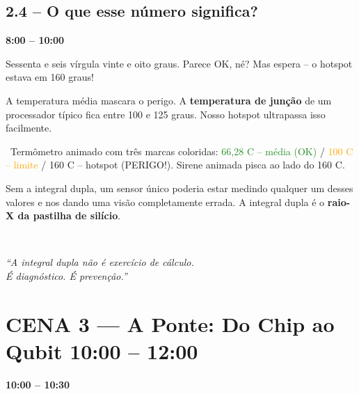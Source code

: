 \documentclass[12pt, a4paper]{article}
\newcommand{\tempo}[1]{%
  \noindent\hfill
  {\small\sffamily\color{corTempo}%
   \faStopwatch\enspace\textbf{#1}}%
  \par\vspace{2pt}%
}
\begin{document}
\subsection{2.4 -- O que esse número significa?}
\tempo{8:00 -- 10:00}

\begin{fala}
Sessenta e seis vírgula vinte e oito graus. Parece OK, né?
Mas espera -- o hotspot estava em 160 graus!
\end{fala}

\begin{fala}
A temperatura média mascara o perigo. A \textbf{temperatura de junção}
de um processador típico fica entre 100 e 125 graus.
Nosso hotspot ultrapassa isso facilmente.
\end{fala}

\begin{visual}
\faFilm\ Termômetro animado com três marcas coloridas:
\textcolor{ForestGreen}{66,28 {\textdegree}C -- média (OK)} /
\textcolor{Orange}{100 {\textdegree}C -- limite} /
\textcolor{corAlerta}{160 {\textdegree}C -- hotspot (PERIGO!)}.
Sirene animada pisca ao lado do 160 {\textdegree}C.
\end{visual}

\begin{fala}
Sem a integral dupla, um sensor único poderia estar medindo qualquer
um desses valores e nos dando uma visão completamente errada.
A integral dupla é o \textbf{raio-X da pastilha de silício}.
\end{fala}

\begin{tela}
\faDesktop\
\begin{center}
\large\itshape
``A integral dupla não é exercício de cálculo.\\
É diagnóstico. É prevenção.''
\end{center}
\end{tela}

\section{CENA 3 --- A Ponte: Do Chip ao Qubit \hfill \normalfont\small\color{corTempo}10:00 -- 12:00}

\tempo{10:00 -- 10:30}
\end{document}
